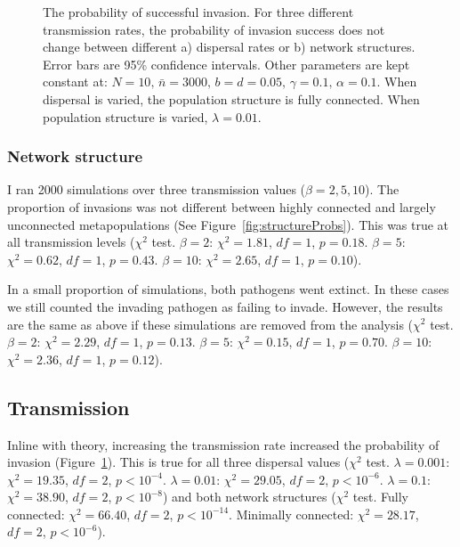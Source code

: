 \begin{figure}[b]
\caption[Invasion probability]{
The probability of successful invasion. 
For three different transmission rates, the probability of invasion success does not change between different a) dispersal rates or b) network structures. 
Error bars are 95\% confidence intervals. 
Other parameters are kept constant at: $N = 10,\, \bar{n} = 3000,\, b = d = 0.05,\, \gamma = 0.1,\, \alpha = 0.1$. 
When dispersal is varied, the population structure is fully connected. When population structure is varied, $\lambda = 0.01$.
}
\label{f:props}
\end{figure}


\subsubsection{Network structure}


I ran 2000 simulations over three transmission values ($\beta = 2, 5, 10$).
The proportion of invasions was not different between highly connected and largely unconnected metapopulations (See Figure~\ref{fig:structureProbs}). 
This was true at all transmission levels ($\chi^2$ test. $\beta = 2$: $\chi^2 = 1.81$, $df = 1$, $p =  0.18$. $\beta = 5$: $\chi^2 =  0.62$, $df = 1$, $p = 0.43$. $\beta = 10$: $\chi^2 = 2.65$, $df = 1$, $p =0.10$).

In a small proportion of simulations, both pathogens went extinct.
In these cases we still counted the invading pathogen as failing to invade.
However, the results are the same as above if these simulations are removed from the analysis ($\chi^2$ test. $\beta = 2$: $\chi^2 = 2.29$, $df = 1$, $p = 0.13$. $\beta = 5$: $\chi^2 = 0.15$, $df = 1$, $p = 0.70$. $\beta = 10$: $\chi^2 = 2.36$, $df = 1$, $p = 0.12$).

 
\subsection{Transmission}

Inline with theory, increasing the transmission rate increased the probability of invasion (Figure~\ref{f:props}).
This is true for all three dispersal values ($\chi^2$ test. $\lambda = 0.001$: $\chi^2 = 19.35$, $df = 2$, $p < 10^{-4}$. $\lambda = 0.01$: $\chi^2 = 29.05$, $df = 2$, $p < 10^{-6}$. $\lambda = 0.1$: $\chi^2 = 38.90$, $df = 2$, $p < 10^{-8}$) and both network structures ($\chi^2$ test. Fully connected: $\chi^2 = 66.40$, $df = 2$, $p < 10^{-14}$. Minimally connected: $\chi^2 = 28.17$, $df = 2$, $p < 10^{-6}$).




